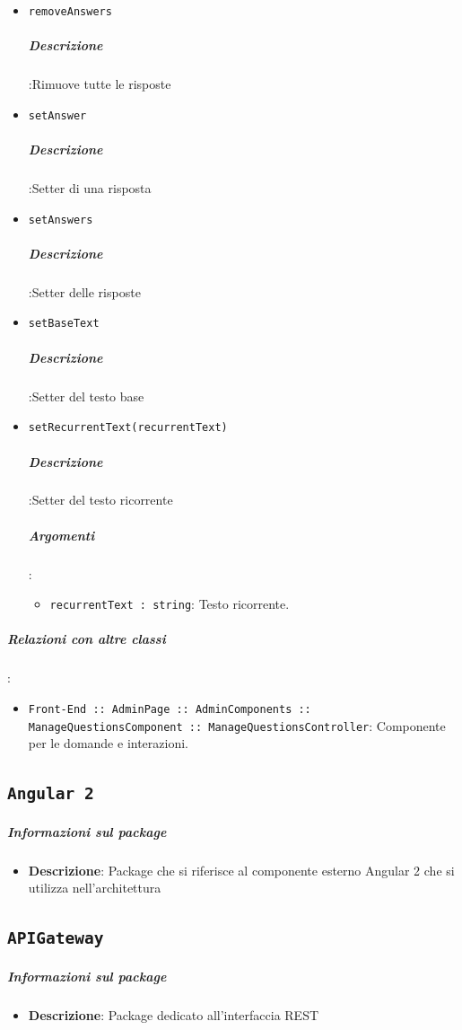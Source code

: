 \documentclass[../DefinizioneDiProdotto_v3.0.0.tex]{subfiles}
\begin{document}
\begin{itemize}
		      	\item \texttt{removeAnswers}
		      	      \subparagraph{Descrizione}:Rimuove tutte le risposte

		      	\item \texttt{setAnswer}
		      	      \subparagraph{Descrizione}:Setter di una risposta

		      	\item \texttt{setAnswers}
		      	      \subparagraph{Descrizione}:Setter delle risposte

		      	\item \texttt{setBaseText}
		      	      \subparagraph{Descrizione}:Setter del testo base

		      	\item \texttt{setRecurrentText(recurrentText)}
		      	      \subparagraph{Descrizione}:Setter del testo ricorrente
					\subparagraph{Argomenti}:
						\begin{itemize}
							\item \texttt{recurrentText : string}:
								Testo ricorrente.
						\end{itemize}
		      \end{itemize}\vspace{0.5em}
		\subparagraph{Relazioni con altre classi}:
		      \begin{itemize}
		      	\item \texttt{Front-End :: AdminPage :: AdminComponents :: ManageQuestionsComponent :: ManageQuestionsController}: Componente per le domande e interazioni.
		      \end{itemize}



\subsection{\texttt{Angular 2}}
\subparagraph{Informazioni sul package}
\begin{itemize}
	\item \textbf{Descrizione}: Package che si riferisce al componente esterno Angular 2 che si utilizza nell'architettura
\end{itemize}
\subsection{\texttt{APIGateway}}
\subparagraph{Informazioni sul package}
\begin{itemize}
	\item \textbf{Descrizione}: Package dedicato all'interfaccia REST
\end{itemize}
\newpage
\end{document}
